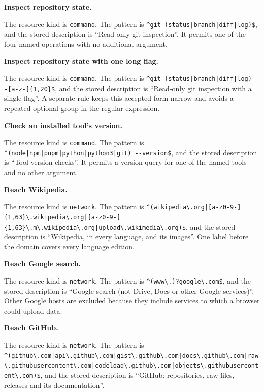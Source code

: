 \begin{enumerate}
  \item \textbf{Inspect repository state.}

  The resource kind is \texttt{command}. The pattern is
  \lstinline[style=gpattern]~^git (status|branch|diff|log)$~, and the stored description is
  ``Read-only git inspection''. It permits one of the four named operations
  with no additional argument.

  \item \textbf{Inspect repository state with one long flag.}

  The resource kind is \texttt{command}. The pattern is
  \lstinline[style=gpattern]~^git (status|branch|diff|log) --[a-z-]{1,20}$~, and the stored
  description is ``Read-only git inspection with a single flag''. A separate
  rule keeps this accepted form narrow and avoids a repeated optional group in
  the regular expression.

  \item \textbf{Check an installed tool's version.}

  The resource kind is \texttt{command}. The pattern is
  \lstinline[style=gpattern]~^(node|npm|pnpm|python|python3|git) --version$~, and the stored
  description is ``Tool version checks''. It permits a version query for one of
  the named tools and no other argument.

  {\color{red}\item \textbf{Reach Wikipedia.}

  The resource kind is \texttt{network}. The pattern is
  \lstinline[style=gpattern]~^(wikipedia\.org|[a-z0-9-]{1,63}\.wikipedia\.org|[a-z0-9-]{1,63}\.m\.wikipedia\.org|upload\.wikimedia\.org)$~,
  and the stored description is ``Wikipedia, in every language, and its
  images''. One label before the domain covers every language edition.}

  {\color{red}\item \textbf{Reach Google search.}

  The resource kind is \texttt{network}. The pattern is
  \lstinline[style=gpattern]~^(www\.)?google\.com$~, and the stored description
  is ``Google search (not Drive, Docs or other Google services)''. Other Google
  hosts are excluded because they include services to which a browser could
  upload data.}

  {\color{red}\item \textbf{Reach GitHub.}

  The resource kind is \texttt{network}. The pattern is
  \lstinline[style=gpattern]~^(github\.com|api\.github\.com|gist\.github\.com|docs\.github\.com|raw\.githubusercontent\.com|codeload\.github\.com|objects\.githubusercontent\.com)$~,
  and the stored description is ``GitHub: repositories, raw files, releases and
  its documentation''.}


\end{enumerate}
